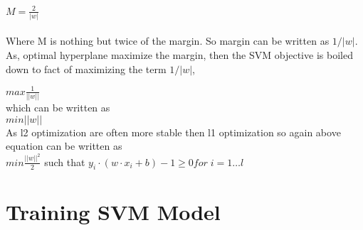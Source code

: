 \documentclass[10pt,a4paper]{report}
\begin{document}
$M = \frac{2}{|w|} $\\
\\
\clearpage
Where M is nothing but twice of the margin. So margin can be written as $ 1/|w| $. As, optimal hyperplane maximize the margin, then the SVM objective is boiled down to fact of maximizing the term $1/|w|$,
\begin{center}
    $ max \frac{1}{||w||} $ \\
    which can be written as \\
    $ min ||w|| $ \\
    As l2 optimization are often more stable then l1 optimization so again above equation can be written as \\
    $ min \frac{||w||^2}{2}$ such that $ y_i \cdot (w \cdot x_i + b) - 1 \geq 0 for \; i = 1\dots l$
    
\end{center}
\clearpage

\chapter{Training SVM Model}
\end{document}
